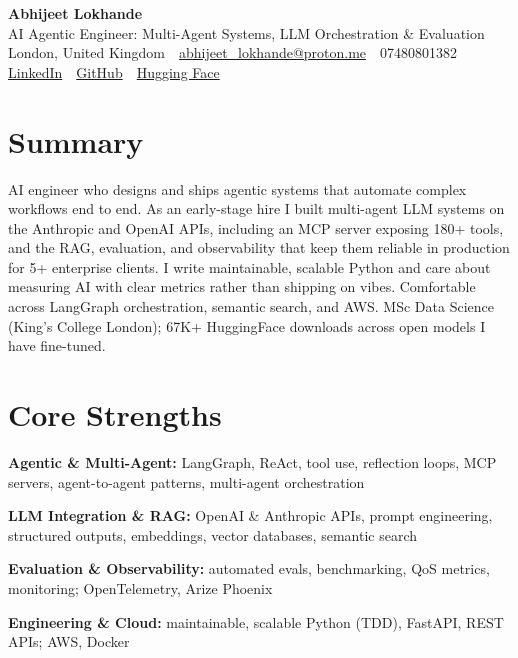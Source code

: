 \documentclass[10pt,a4paper]{article}
\newcommand{\sep}{\,\textcolor{accent!60}{\textbar}\,}
\begin{document}
\begin{center}
  {\fontsize{24}{26}\selectfont\bfseries Abhijeet Lokhande}\\[3pt]
  {\color{accent}\large AI Agentic Engineer: Multi-Agent Systems, LLM Orchestration \& Evaluation}\\[5pt]
  {\small
    London, United Kingdom \sep
    \href{mailto:abhijeet_lokhande@proton.me}{abhijeet\_lokhande@proton.me} \sep
    07480801382 \\[2pt]
    \href{https://www.linkedin.com/in/ablds/}{LinkedIn} \sep
    \href{https://github.com/abhijeetscode}{GitHub} \sep
    \href{https://huggingface.co/ab-ai}{Hugging Face}
  }
\end{center}
\vspace{2pt}

\section{Summary}
AI engineer who designs and ships agentic systems that automate complex workflows end to end. As an early-stage hire I built multi-agent LLM systems on the Anthropic and OpenAI APIs, including an MCP server exposing 180+ tools, and the RAG, evaluation, and observability that keep them reliable in production for 5+ enterprise clients. I write maintainable, scalable Python and care about measuring AI with clear metrics rather than shipping on vibes. Comfortable across LangGraph orchestration, semantic search, and AWS. MSc Data Science (King's College London); 67K+ HuggingFace downloads across open models I have fine-tuned.

\section{Core Strengths}
\begin{tight}
  \item[\textcolor{accent}{\small$\bullet$}] \textbf{Agentic \& Multi-Agent:} LangGraph, ReAct, tool use, reflection loops, MCP servers, agent-to-agent patterns, multi-agent orchestration
  \item[\textcolor{accent}{\small$\bullet$}] \textbf{LLM Integration \& RAG:} OpenAI \& Anthropic APIs, prompt engineering, structured outputs, embeddings, vector databases, semantic search
  \item[\textcolor{accent}{\small$\bullet$}] \textbf{Evaluation \& Observability:} automated evals, benchmarking, QoS metrics, monitoring; OpenTelemetry, Arize Phoenix
  \item[\textcolor{accent}{\small$\bullet$}] \textbf{Engineering \& Cloud:} maintainable, scalable Python (TDD), FastAPI, REST APIs; AWS, Docker
\end{tight}
\end{document}
